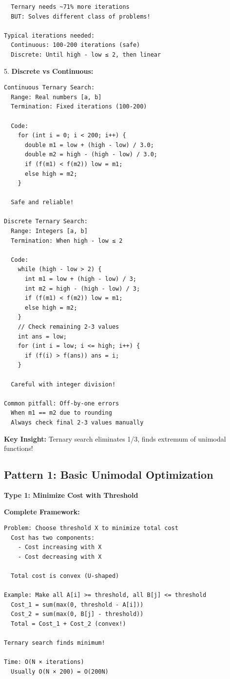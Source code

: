 \documentclass[11pt,a4paper,oneside]{book}
\begin{document}
\begin{tcolorbox}[
    enhanced,breakable,
    colback=white,
    colframe=deepblue,
    boxrule=1.5pt,
    arc=3mm,
    title=\textbf{The Unimodal Property}
]
\begin{verbatim}
  Ternary needs ~71% more iterations
  BUT: Solves different class of problems!

Typical iterations needed:
  Continuous: 100-200 iterations (safe)
  Discrete: Until high - low ≤ 2, then linear
\end{verbatim}

5. \textbf{Discrete vs Continuous:}
\begin{verbatim}
Continuous Ternary Search:
  Range: Real numbers [a, b]
  Termination: Fixed iterations (100-200)
  
  Code:
    for (int i = 0; i < 200; i++) {
      double m1 = low + (high - low) / 3.0;
      double m2 = high - (high - low) / 3.0;
      if (f(m1) < f(m2)) low = m1;
      else high = m2;
    }
  
  Safe and reliable!

Discrete Ternary Search:
  Range: Integers [a, b]
  Termination: When high - low ≤ 2
  
  Code:
    while (high - low > 2) {
      int m1 = low + (high - low) / 3;
      int m2 = high - (high - low) / 3;
      if (f(m1) < f(m2)) low = m1;
      else high = m2;
    }
    // Check remaining 2-3 values
    int ans = low;
    for (int i = low; i <= high; i++) {
      if (f(i) > f(ans)) ans = i;
    }
  
  Careful with integer division!

Common pitfall: Off-by-one errors
  When m1 == m2 due to rounding
  Always check final 2-3 values manually
\end{verbatim}

\textbf{Key Insight:}
Ternary search eliminates 1/3, finds extremum of unimodal functions!
\end{tcolorbox}

\subsection{Pattern 1: Basic Unimodal Optimization}

\begin{tcolorbox}[
    enhanced,breakable,
    colback=successgreen!10,
    colframe=successgreen,
    boxrule=1.5pt,
    arc=3mm,
    title=\textbf{Complete Basic Optimization Algorithms}
]
\textbf{Type 1: Minimize Cost with Threshold}

\textbf{Complete Framework:}
\begin{verbatim}
Problem: Choose threshold X to minimize total cost
  Cost has two components:
    - Cost increasing with X
    - Cost decreasing with X
  
  Total cost is convex (U-shaped)

Example: Make all A[i] >= threshold, all B[j] <= threshold
  Cost_1 = sum(max(0, threshold - A[i]))
  Cost_2 = sum(max(0, B[j] - threshold))
  Total = Cost_1 + Cost_2 (convex!)

Ternary search finds minimum!

Time: O(N × iterations)
  Usually O(N × 200) = O(200N)
\end{verbatim}
\end{tcolorbox}
\end{document}
